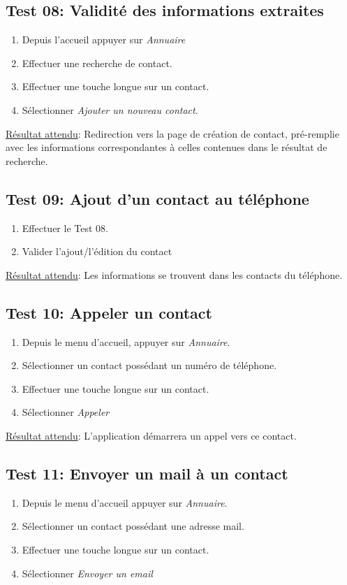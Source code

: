 \documentclass [pdftex,12pt] {report}
\begin{document}
  \subsection{Test 08: Validité des informations extraites}
    \begin{enumerate}
    \item Depuis l'accueil appuyer sur \emph{Annuaire}
    \item Effectuer une recherche de contact.
    \item Effectuer une touche longue sur un contact.
    \item Sélectionner \emph{Ajouter un nouveau contact}.
    \end{enumerate}

    \underline{Résultat attendu}: Redirection vers la page de création de contact, pré-remplie avec les informations correspondantes à celles contenues dans le résultat de recherche.

  \subsection{Test 09: Ajout d'un contact au téléphone}
    \begin{enumerate}
    \item Effectuer le Test 08.
    \item Valider l'ajout/l'édition du contact
    \end{enumerate}

    \underline{Résultat attendu}: Les informations se trouvent dans les contacts du téléphone.

  \subsection{Test 10: Appeler un contact}
    \begin{enumerate}
    \item Depuis le menu d'accueil, appuyer sur \emph{Annuaire}.
    \item Sélectionner un contact possédant un numéro de téléphone.
    \item Effectuer une touche longue sur un contact.
    \item Sélectionner \emph{Appeler}
    \end{enumerate}

    \underline{Résultat attendu}: L'application démarrera un appel vers ce contact.

  \subsection{Test 11: Envoyer un mail à un contact}
    \begin{enumerate}
    \item Depuis le menu d'accueil appuyer sur \emph{Annuaire}.
    \item Sélectionner un contact possédant une adresse mail.
    \item Effectuer une touche longue sur un contact.
    \item Sélectionner \emph{Envoyer un email}
    \end{enumerate}
\end{document}
